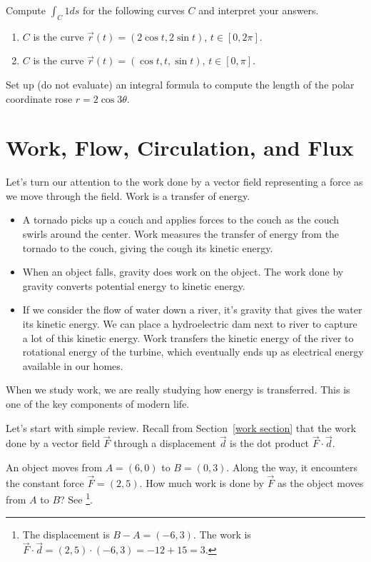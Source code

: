 \begin{problem}
  Compute $\int_C 1 ds$ for the following curves $C$ and interpret your answers.
  \begin{enumerate}
  \item $C$ is the curve $\vec r(t)=(2\cos t, 2\sin t)$, $t\in [0,2\pi]$.
  \item $C$ is the curve $\vec r(t)=(\cos t, t, \sin t)$, $t\in[0,\pi]$.
  \end{enumerate}
\end{problem}


\begin{problem*}[Challenge] 
Set up (do not evaluate) an integral formula to compute the length of 
the polar coordinate rose $r=2\cos 3\theta$.
\end{problem*}


\section{Work, Flow, Circulation, and Flux}

Let's turn our attention to the work done by a vector field representing a force as we move through the field.  Work is a transfer of energy. 
\begin{itemize}
 \item A tornado picks up a couch and applies forces to the couch as the couch swirls around the center. Work measures the transfer of energy from the tornado to the couch, giving the cough its kinetic energy. 
 \item When an object falls, gravity does work on the object. The work done by gravity converts potential energy to kinetic energy. 
 \item If we consider the flow of water down a river, it's gravity that gives the water its kinetic energy. We can place a hydroelectric dam next to river to capture a lot of this kinetic energy.  Work transfers the kinetic energy of the river to rotational energy of the turbine, which eventually ends up as electrical energy available in our homes.
\end{itemize}
When we study work, we are really studying how energy is transferred. This is one of the key components of modern life.

Let's start with simple review. Recall from Section~\ref{work section} that the work done by a vector field $\vec F$ through a displacement $\vec d$ is the dot product $\vec F\cdot \vec d$. 
\begin{review*}
 An object moves from $A=(6,0)$ to $B=(0,3)$. Along the way, it encounters the constant force $\vec F = (2,5)$.  How much work is done by $\vec F$ as the object moves from $A$ to $B$? See \footnote{The displacement is $B-A=(-6,3)$. The work is $\vec F\cdot \vec d = (2,5)\cdot(-6,3) = -12+15=3$.}.
\end{review*}

